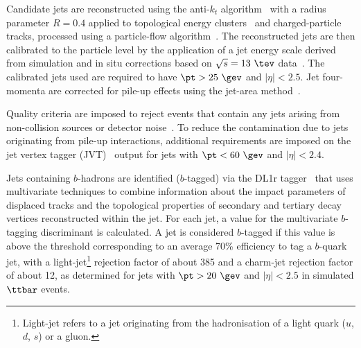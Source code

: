 \documentclass[PAPER, coverpage, atlasdraft=true, texlive=2016, UKenglish]{\ATLASLATEXPATH atlasdoc}
\providecommand{\DIFadd}[1]{{\protect\color{blue}\uwave{#1}}} %
\providecommand{\DIFaddbegin}{} %
\providecommand{\DIFaddend}{} %
\begin{document}
Candidate jets are reconstructed using the anti-$k_t$ algorithm~\cite{Cacciari:2008gp,Cacciari:2005hq} with a
radius parameter $R=0.4$ applied to topological energy clusters~\cite{Aad:2016upy} and charged-particle tracks, processed using
a particle-flow algorithm~\cite{Aad:2017epj77}. %
The reconstructed jets are then calibrated to the particle level by the application of a jet energy scale 
derived from simulation and in situ corrections based on $\sqrt{s}=13~\tev$ data~\cite{Aaboud:2017jcu}. %
The calibrated jets used are required to have $\pt > 25~\gev$ and $|\eta| < 2.5$.
Jet four-momenta are corrected for pile-up effects using the jet-area method~\cite{Cacciari:2008gn}.

Quality criteria are imposed to reject events that contain any jets arising from non-collision sources
or detector noise~\cite{ATLAS-CONF-2015-029}.  To reduce the contamination due to jets originating from pile-up interactions,
additional requirements are imposed on the jet vertex tagger (JVT)~\cite{Aad:2015ina} output for jets with $\pt<60~\gev$ and $|\eta| < 2.4$.

Jets containing $b$-hadrons are identified ($b$-tagged) via the DL1r tagger~\cite{Aad:2019epj79,ATL-PHYS-PUB-2017-013} %
that uses multivariate techniques to combine information about the impact parameters of displaced tracks and the  topological properties 
of secondary and tertiary decay vertices reconstructed within the jet. For each jet, a value for the multivariate $b$-tagging discriminant is 
calculated. A jet is considered $b$-tagged if this value is above the threshold corresponding to
an average 70\% efficiency to tag a $b$-quark jet, with a light-jet\footnote{Light-jet refers to a jet originating from the hadronisation of a light quark ($u$, $d$, $s$) or a gluon.} rejection factor of about 385 and a charm-jet rejection factor of about 12, as determined for jets with
$\pt >20~\gev$ and $|\eta|<2.5$ in simulated $\ttbar$ events\DIFaddbegin \DIFadd{~\mbox{%
\cite{Aad:2019epj79}}\hspace{0pt}%
}\DIFaddend .
\end{document}
